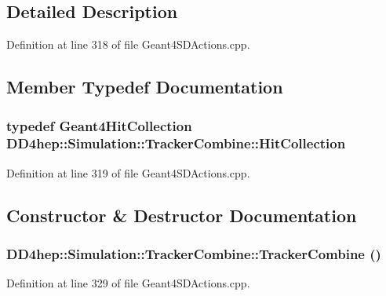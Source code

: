 \subsection{Detailed Description}


Definition at line 318 of file Geant4SDActions.cpp.

\subsection{Member Typedef Documentation}
\hypertarget{struct_d_d4hep_1_1_simulation_1_1_tracker_combine_ae776b8d22a42d425b4d9b6344ed430e1}{
\subsubsection[{HitCollection}]{\setlength{\rightskip}{0pt plus 5cm}typedef {\bf Geant4HitCollection} {\bf DD4hep::Simulation::TrackerCombine::HitCollection}}}
\label{struct_d_d4hep_1_1_simulation_1_1_tracker_combine_ae776b8d22a42d425b4d9b6344ed430e1}


Definition at line 319 of file Geant4SDActions.cpp.

\subsection{Constructor \& Destructor Documentation}
\hypertarget{struct_d_d4hep_1_1_simulation_1_1_tracker_combine_a60747607cdefc8283d864c6f5313a392}{
\subsubsection[{TrackerCombine}]{\setlength{\rightskip}{0pt plus 5cm}DD4hep::Simulation::TrackerCombine::TrackerCombine ()}}
\label{struct_d_d4hep_1_1_simulation_1_1_tracker_combine_a60747607cdefc8283d864c6f5313a392}


Definition at line 329 of file Geant4SDActions.cpp.

